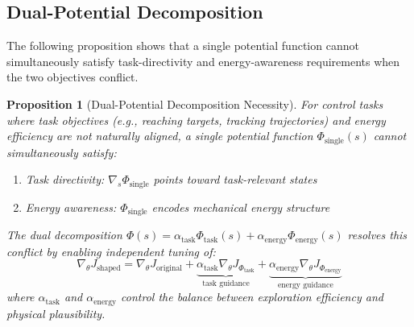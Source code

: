 \documentclass[journal]{IEEEtran}
\newtheorem{proposition}[theorem]{Proposition}
\begin{document}
	\subsection{Dual-Potential Decomposition}
	
	The following proposition shows that a single potential function cannot simultaneously satisfy task-directivity and energy-awareness requirements when the two objectives conflict.
	
	\begin{proposition}[Dual-Potential Decomposition Necessity]
		\label{prop:dual_necessity}
		For control tasks where task objectives (e.g., reaching targets, tracking trajectories) and energy efficiency are not naturally aligned, a single potential function $\Phi_{\text{single}}(s)$ cannot simultaneously satisfy:
		\begin{enumerate}
			\item Task directivity: $\nabla_s \Phi_{\text{single}}$ points toward task-relevant states
			\item Energy awareness: $\Phi_{\text{single}}$ encodes mechanical energy structure
		\end{enumerate}
		
		The dual decomposition $\Phi(s) = \alpha_{\text{task}}\Phi_{\text{task}}(s) + \alpha_{\text{energy}}\Phi_{\text{energy}}(s)$ resolves this conflict by enabling independent tuning of:
		\begin{equation}
			\nabla_\theta J_{\text{shaped}} = \nabla_\theta J_{\text{original}} + \underbrace{\alpha_{\text{task}} \nabla_\theta J_{\Phi_{\text{task}}}}_{\text{task guidance}} + \underbrace{\alpha_{\text{energy}} \nabla_\theta J_{\Phi_{\text{energy}}}}_{\text{energy guidance}}
		\end{equation}
		where $\alpha_{\text{task}}$ and $\alpha_{\text{energy}}$ control the balance between exploration efficiency and physical plausibility.
	\end{proposition}
	
\end{document}
